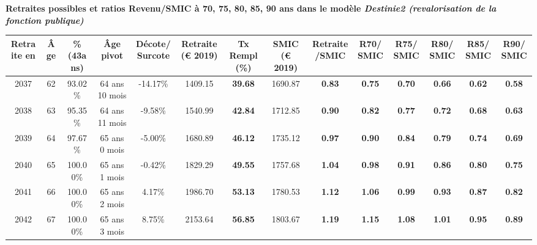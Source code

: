  \vspace{0.1cm} 
{\bf \noindent Retraites possibles et ratios Revenu/SMIC à 70, 75, 80, 85, 90 ans dans le modèle \emph{Destinie2 (revalorisation de la fonction publique)}}  
 
\begin{adjustbox}{max width=\textwidth} 
\begin{tabular}[htb]{|c|c||c|c|c||c|c||c|c||c|c|c|c|c|} 
\hline 
 Retraite en &  Âge &  \%(43ans) &  Âge pivot &  Décote/Surcote &  Retraite (\euro{} 2019) &  Tx Rempl(\%) &  SMIC (\euro{} 2019) &  Retraite/SMIC &  R70/SMIC &  R75/SMIC &  R80/SMIC &  R85/SMIC &  R90/SMIC \\ 
\hline \hline 
 2037 &  62 &  93.02\% &  64 ans 10 mois &  -14.17\% &  1409.15 &  {\bf 39.68} &  1690.87 &  {\bf {\color{red} 0.83}} &  {\bf {\color{red} 0.75}} &  {\bf {\color{red} 0.70}} &  {\bf {\color{red} 0.66}} &  {\bf {\color{red} 0.62}} &  {\bf {\color{red} 0.58}} \\ 
\hline 
 2038 &  63 &  95.35\% &  64 ans 11 mois &  -9.58\% &  1540.99 &  {\bf 42.84} &  1712.85 &  {\bf {\color{red} 0.90}} &  {\bf {\color{red} 0.82}} &  {\bf {\color{red} 0.77}} &  {\bf {\color{red} 0.72}} &  {\bf {\color{red} 0.68}} &  {\bf {\color{red} 0.63}} \\ 
\hline 
 2039 &  64 &  97.67\% &  65 ans 0 mois &  -5.00\% &  1680.89 &  {\bf 46.12} &  1735.12 &  {\bf {\color{red} 0.97}} &  {\bf {\color{red} 0.90}} &  {\bf {\color{red} 0.84}} &  {\bf {\color{red} 0.79}} &  {\bf {\color{red} 0.74}} &  {\bf {\color{red} 0.69}} \\ 
\hline 
 2040 &  65 &  100.00\% &  65 ans 1 mois &  -0.42\% &  1829.29 &  {\bf 49.55} &  1757.68 &  {\bf 1.04} &  {\bf {\color{red} 0.98}} &  {\bf {\color{red} 0.91}} &  {\bf {\color{red} 0.86}} &  {\bf {\color{red} 0.80}} &  {\bf {\color{red} 0.75}} \\ 
\hline 
 2041 &  66 &  100.00\% &  65 ans 2 mois &  4.17\% &  1986.70 &  {\bf 53.13} &  1780.53 &  {\bf 1.12} &  {\bf 1.06} &  {\bf {\color{red} 0.99}} &  {\bf {\color{red} 0.93}} &  {\bf {\color{red} 0.87}} &  {\bf {\color{red} 0.82}} \\ 
\hline 
 2042 &  67 &  100.00\% &  65 ans 3 mois &  8.75\% &  2153.64 &  {\bf 56.85} &  1803.67 &  {\bf 1.19} &  {\bf 1.15} &  {\bf 1.08} &  {\bf 1.01} &  {\bf {\color{red} 0.95}} &  {\bf {\color{red} 0.89}} \\ 
\hline 
\hline 
\end{tabular} 
\end{adjustbox} 
 
